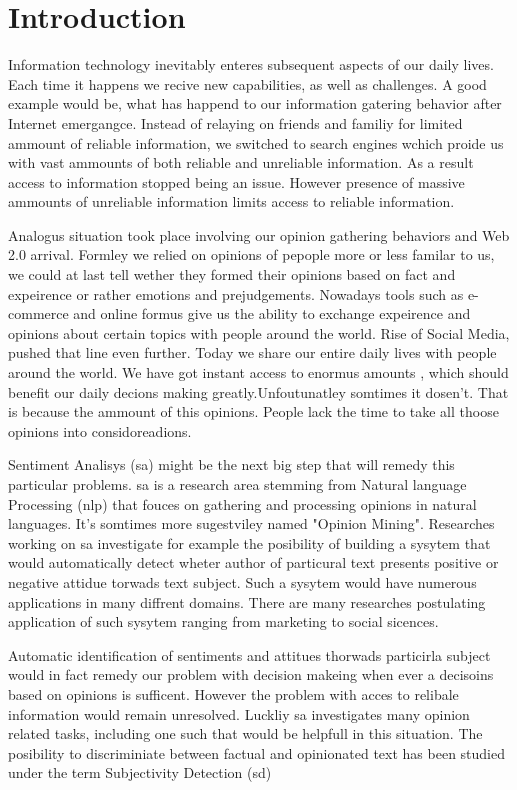 \chapter{Introduction}

Information technology inevitably enteres subsequent aspects of our daily lives. Each time it happens 
we recive new capabilities, as well as challenges. A good example would be, what has happend to our
information gatering behavior after Internet emergangce. Instead of relaying on friends and familiy
for limited ammount of reliable information, we switched to search engines wchich proide us with
vast ammounts of both reliable and unreliable information. As a result access to information stopped
being an issue. However presence of massive ammounts of unreliable information limits access to reliable
information.

Analogus situation took place involving our opinion gathering behaviors and Web 2.0 arrival. Formley we relied 
on opinions of pepople more or less familar to us, we could at last tell wether
they formed their opinions based on fact and expeirence or rather emotions and prejudgements. Nowadays 
tools such as e-commerce and online formus give us the ability to exchange expeirence and opinions about
certain topics with people around the world. Rise of Social Media, pushed that line even further. Today
we share our entire daily lives with people around the world. We have got instant access to enormus amounts 
, which should benefit our daily decions making greatly.Unfoutunatley somtimes it dosen't. 
That is because the ammount of this opinions. People lack the time to take all thoose opinions into considoreadions. 

Sentiment Analisys (\ac{sa}) might be the next big step that will remedy this particular problems. \ac{sa} is a 
research area stemming from Natural language Processing (\ac{nlp}) that fouces on gathering and processing opinions
in natural languages. It's somtimes more sugestviley named "Opinion Mining".  Researches working on \ac{sa} investigate
for example the posibility of building a sysytem that would automatically detect wheter author of particural text presents positive or
negative attidue torwads text subject. Such a sysytem would have numerous applications in many diffrent domains.
There are many researches postulating application of such sysytem ranging from marketing to social sicences.  

Automatic identification of sentiments and attitues thorwads particirla subject would in fact remedy our problem 
with decision makeing when ever a decisoins based on opinions is sufficent. However the problem with acces to relibale 
information would remain unresolved. Luckliy \ac{sa} investigates many opinion related tasks, including one such that
would be helpfull in this situation. The posibility to discriminiate between factual and opinionated text has been studied
under the term Subjectivity Detection (\ac{sd})

